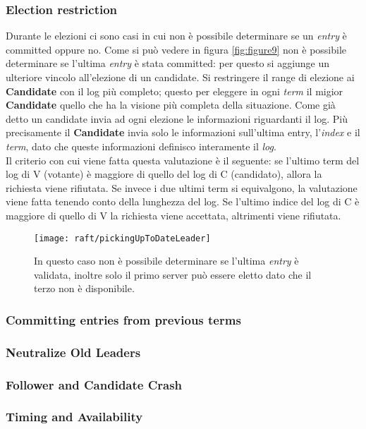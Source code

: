   \subsubsection{Election restriction}
  Durante le elezioni ci sono casi in cui non è possibile determinare se un \textit{entry} è committed oppure no.
  Come si può vedere in figura \ref{fig:figure9} non è possibile determinare se l'ultima \textit{entry} è stata committed: per questo si aggiunge un ulteriore vincolo all'elezione di un candidate.
  Si restringere il range di elezione ai \textbf{Candidate} con il log più completo; questo per eleggere in ogni \textit{term} il migior \textbf{Candidate} quello che ha la visione più completa della situazione. 
  Come già detto un candidate invia ad ogni elezione le informazioni riguardanti il log.
  Più precisamente il \textbf{Candidate} invia solo le informazioni sull'ultima entry, l'\textit{index} e il \textit{term}, dato che queste informazioni definisco interamente il \textit{log}.
  \\
  Il criterio con cui viene fatta questa valutazione è il seguente: se l'ultimo term del log di V (votante) è maggiore di quello del log di C (candidato), allora la  richiesta viene rifiutata. Se invece i due ultimi term si equivalgono, la valutazione viene fatta tenendo conto della lunghezza del log. Se l'ultimo indice del log di C è maggiore di quello di V la richiesta viene accettata, altrimenti viene rifiutata.
  	
  \begin{figure}[H]
  	\centering
  	\texttt{[image: raft/pickingUpToDateLeader]}
  	\captionsetup{singlelinecheck=off}
  	\caption[stateDiagramCaption]{
	In questo caso non è possibile determinare se l'ultima \textit{entry} è validata, inoltre solo il primo server può essere eletto dato che il terzo non è disponibile.}
  	\label{fig:figure10}
  \end{figure}
  \subsubsection{Committing entries from previous terms}
  \subsubsection{Neutralize Old Leaders}
  \subsubsection{Follower and Candidate Crash}
  \subsubsection{Timing and Availability}